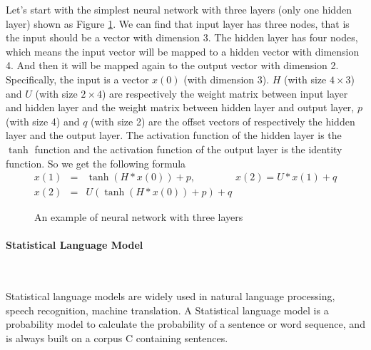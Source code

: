Let's start with the simplest neural network with three layers (only one hidden layer) shown as Figure \ref{fig:neural3}. We can find that input layer has three nodes, that is the input should be a vector with dimension 3. The hidden layer has four nodes, which means the input vector will be mapped to a hidden vector with dimension 4. And then it will be mapped again to the output vector with dimension 2. Specifically, the input is a vector $x(0)$ (with dimension 3). $H$ (with size $4\times 3$) and $U$ (with size $2\times 4$) are respectively the weight matrix between input layer and hidden layer and the weight matrix between hidden layer and output layer, $p$ (with size 4) and $q$ (with size 2) are the offset vectors of respectively the hidden layer and the output layer. The activation function of the hidden layer is the $\tanh$ function 
and the activation function of the output layer is the identity function.  So we get the following formula
\begin{eqnarray}
x(1) &=&  \tanh(H * x(0)) + p, \qquad\qquad x(2) =  U * x(1) + q \nonumber \\
x(2) &=& U(\tanh(H * x(0)) + p) +q \label{eq:neural}
\end{eqnarray}


\begin{figure}[tb]
  \centering
	\caption{An example of neural network with three layers}
	\label{fig:neural3}
\end{figure}

\paragraph{Statistical Language Model}\ 

Statistical language models are widely used in natural language processing, speech recognition, machine translation. A Statistical language model is a probability model to calculate the probability of a sentence or word sequence, and is always built on a corpus \gls{C} containing sentences. 

